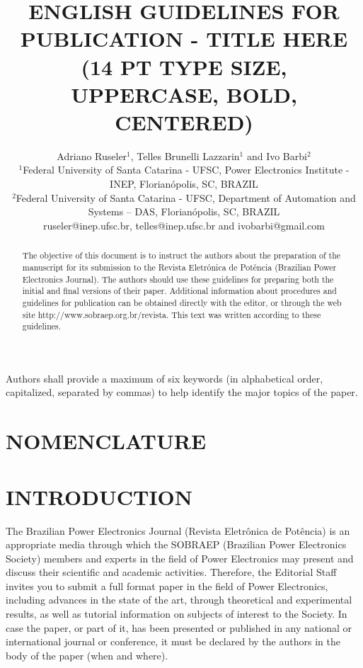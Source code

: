 \documentclass[english]{cobep-spec}
\title{ENGLISH GUIDELINES FOR PUBLICATION - TITLE HERE \\(14 PT TYPE SIZE, UPPERCASE, BOLD, CENTERED)}
\author{Adriano Ruseler$^{1}$, Telles Brunelli Lazzarin$^{1}$ and Ivo Barbi$^{2}$\\
	\normalsize $^{1}$Federal University of Santa Catarina - UFSC, Power Electronics Institute - INEP, Florian\'opolis, SC, BRAZIL\\
	\normalsize $^{2}$Federal University of Santa Catarina - UFSC, Department of Automation and Systems -- DAS, Florian\'opolis, SC, BRAZIL\\
	\normalsize ruseler@inep.ufsc.br, telles@inep.ufsc.br and ivobarbi@gmail.com
}
\begin{document}
\maketitle

\begin{abstract}
	The objective of this document is to instruct the authors about the preparation of the manuscript for its submission to the Revista Eletrônica de Potência (Brazilian Power Electronics Journal). The authors should use these guidelines for preparing both the initial and final versions of their paper. Additional information about procedures and guidelines for publication can be obtained directly with the editor, or through the web site http://www.sobraep.org.br/revista. This text was written according to these guidelines.
\end{abstract}

\begin{keywords}
	Authors shall provide a maximum of six keywords (in alphabetical order, capitalized, separated by commas) to help identify the major topics of the paper.
\end{keywords}



\section*{NOMENCLATURE}




\section{INTRODUCTION}

The Brazilian Power Electronics Journal (Revista Eletrônica de Potência) is an appropriate media through which the SOBRAEP (Brazilian Power Electronics Society) members and experts in the field of Power Electronics may present and discuss their scientific and academic activities. Therefore, the Editorial Staff invites you to submit a full format paper in the field of Power Electronics, including advances in the state of the art, through theoretical and experimental results, as well as tutorial information on subjects of interest to the Society. In case the paper, or part of it, has been presented or published in any national or international journal or conference, it must be declared by the authors in the body of the paper (when and where). 
\end{document}

